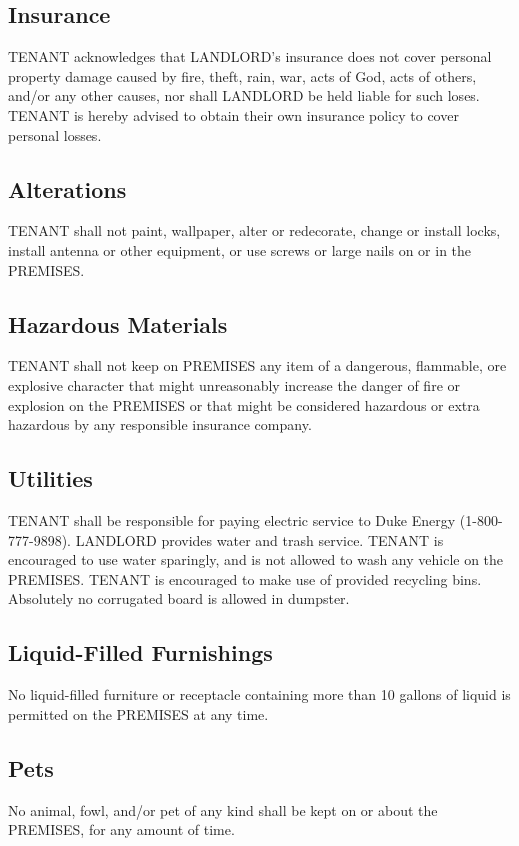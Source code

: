 \documentclass[11pt]{article}
\begin{document}
\subsection{Insurance}
\label{sec:org1bf0bc0}
TENANT acknowledges that LANDLORD's insurance does not cover personal
property damage caused by fire, theft, rain, war, acts of God, acts of
others, and/or any other causes, nor shall LANDLORD be held liable for
such loses.  TENANT is hereby advised to obtain their own insurance
policy to cover personal losses.

\subsection{Alterations}
\label{sec:org99a0d48}
TENANT shall not paint, wallpaper, alter or redecorate, change or
install locks, install antenna or other equipment, or use screws or
large nails on or in the PREMISES.

\subsection{Hazardous Materials}
\label{sec:org6df0b9c}
TENANT shall not keep on PREMISES any item of a dangerous, flammable,
ore explosive character that might unreasonably increase the danger of
fire or explosion on the PREMISES or that might be considered
hazardous or extra hazardous by any responsible insurance company.

\subsection{Utilities}
\label{sec:org1349ab8}
TENANT shall be responsible for paying electric service to Duke Energy
(1-800-777-9898).  LANDLORD provides water and trash service.  TENANT
is encouraged to use water sparingly, and is not allowed to wash any
vehicle on the PREMISES.  TENANT is encouraged to make use of provided
recycling bins.  Absolutely no corrugated board is allowed in
dumpster.

\subsection{Liquid-Filled Furnishings}
\label{sec:org12c2155}
No liquid-filled furniture or receptacle containing more than 10 gallons
of liquid is permitted on the PREMISES at any time.

\subsection{Pets}
\label{sec:orgc6f56d1}
No animal, fowl, and/or pet of any kind shall be kept on or about the
PREMISES, for any amount of time.
\end{document}
